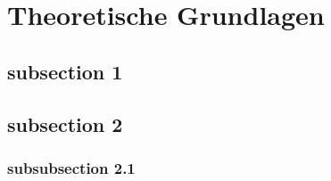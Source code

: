 \section{Theoretische Grundlagen}

\subsection{subsection 1}

\subsection{subsection 2}

\subsubsection{subsubsection 2.1}


\iffalse
Hey, I'm a block comment!
\fi
